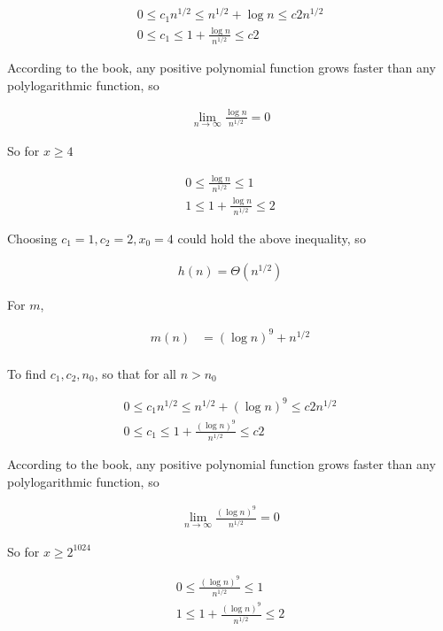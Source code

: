 \documentclass{article}
\begin{document}
$$\begin{aligned}
0 \le c_1n^{1/2} \le n^{1/2}+\log n \le c2n^{1/2}\\
0 \le c_1 \le 1+\frac{\log n}{n^{1/2}} \le c2
\end{aligned}$$


According to the book, any positive polynomial function grows faster than any polylogarithmic function, so

$$\begin{aligned}
\lim\limits_{n\rightarrow\infty}\frac{\log n}{n^{1/2}}=0
\end{aligned}$$

So for $x \ge 4$

$$\begin{aligned}
0 \le \frac{\log n}{n^{1/2}} \le 1\\
1 \le 1+\frac{\log n}{n^{1/2}} \le 2
\end{aligned}$$

Choosing $c_1=1, c_2=2, x_0=4$ could hold the above inequality, so

$$\begin{aligned}
h(n)=\Theta(n^{1/2})
\end{aligned}$$

For $m$,

$$\begin{aligned}
m(n)&=(\log n)^9+n^{1/2}\\
\end{aligned}$$

To find $c_1, c_2, n_0$, so that for all $n>n_0$

$$\begin{aligned}
0 \le c_1n^{1/2} \le n^{1/2}+(\log n)^9 \le c2n^{1/2}\\
0 \le c_1 \le 1+\frac{(\log n)^9}{n^{1/2}} \le c2
\end{aligned}$$


According to the book, any positive polynomial function grows faster than any polylogarithmic function, so

$$\begin{aligned}
\lim\limits_{n\rightarrow\infty}\frac{(\log n)^9}{n^{1/2}}=0
\end{aligned}$$

So for $x \ge 2^{1024}$

$$\begin{aligned}
0 \le \frac{(\log n)^9}{n^{1/2}} \le 1\\
1 \le 1+\frac{(\log n)^9}{n^{1/2}} \le 2
\end{aligned}$$
\end{document}
